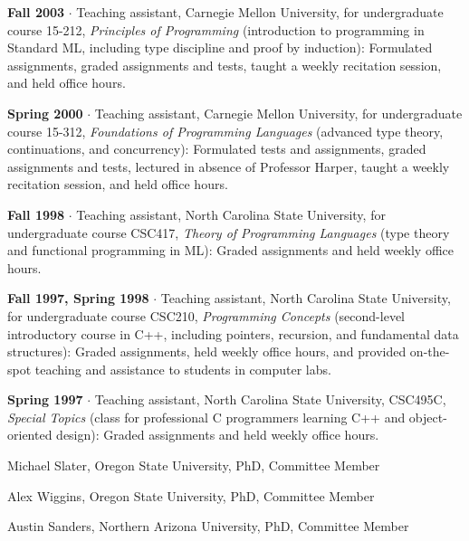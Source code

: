 \documentclass[ComputerScience]{vita}
\begin{document}
\begin{vita}
\begin{Teaching}
   \item {\bf Fall 2003} $\cdot$ Teaching assistant, Carnegie Mellon
   University, for undergraduate course 15-212, \emph{Principles of
   Programming} (introduction to programming in Standard ML, including type
   discipline and proof by induction): Formulated assignments, graded
   assignments and tests, taught a weekly recitation session, and held
   office hours.

   \item {\bf Spring 2000} $\cdot$ Teaching assistant, Carnegie Mellon
   University, for undergraduate course 15-312, \emph{Foundations of
   Programming Languages} (advanced type theory, continuations, and concurrency): Formulated tests and assignments, graded
   assignments and tests, lectured in absence of Professor Harper,
   taught a weekly recitation session, and held office hours.

   \item {\bf Fall 1998} $\cdot$ Teaching assistant, North Carolina
   State University, for undergraduate course CSC417, \emph{Theory of
   Programming Languages} (type theory and functional programming in ML):
   Graded assignments and held weekly office hours.

   \item {\bf Fall 1997, Spring 1998} $\cdot$ Teaching assistant,
   North Carolina State University, for undergraduate course CSC210,
   {\em Programming Concepts} (second-level introductory course in
   C++, including pointers, recursion, and fundamental data
   structures): Graded assignments, held weekly office hours, and
   provided on-the-spot teaching and assistance to students in
   computer labs.

   \item {\bf Spring 1997} $\cdot$ Teaching assistant, North
   Carolina State University, CSC495C, {\em
   Special Topics} (class for professional C programmers learning C++ and object-oriented design):  Graded assignments and held weekly office
   hours.

\end{Teaching}

\begin{Current Students}
\item Michael Slater, Oregon State University, PhD, Committee Member
\item Alex Wiggins, Oregon State University, PhD, Committee Member
\item Austin Sanders, Northern Arizona University, PhD, Committee Member
\end{Current Students}


\end{vita}
\end{document}
